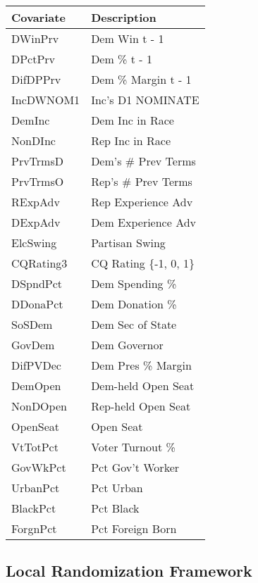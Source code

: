 \documentclass[11pt,leqno]{article}\usepackage[]{graphicx}\usepackage[]{color}
\newenvironment{knitrout}{}{} %
\theoremstyle{newstyle}
\begin{document}
\begin{knitrout}\footnotesize
{}\color{fgcolor}
\begin{tabular}{l|l}
\hline
Covariate & Description\\
\hline
DWinPrv & Dem Win t - 1\\
\hline
DPctPrv & Dem \% t - 1\\
\hline
DifDPPrv & Dem \% Margin t - 1\\
\hline
IncDWNOM1 & Inc's D1 NOMINATE\\
\hline
DemInc & Dem Inc in Race\\
\hline
NonDInc & Rep Inc in Race\\
\hline
PrvTrmsD & Dem's \# Prev Terms\\
\hline
PrvTrmsO & Rep's \# Prev Terms\\
\hline
RExpAdv & Rep Experience Adv\\
\hline
DExpAdv & Dem Experience Adv\\
\hline
ElcSwing & Partisan Swing\\
\hline
CQRating3 & CQ Rating \{-1, 0, 1\}\\
\hline
DSpndPct & Dem Spending \%\\
\hline
DDonaPct & Dem Donation \%\\
\hline
SoSDem & Dem Sec of State\\
\hline
GovDem & Dem Governor\\
\hline
DifPVDec & Dem Pres \% Margin\\
\hline
DemOpen & Dem-held Open Seat\\
\hline
NonDOpen & Rep-held Open Seat\\
\hline
OpenSeat & Open Seat\\
\hline
VtTotPct & Voter Turnout \%\\
\hline
GovWkPct & Pct Gov't Worker\\
\hline
UrbanPct & Pct Urban\\
\hline
BlackPct & Pct Black\\
\hline
ForgnPct & Pct Foreign Born\\
\hline
\end{tabular}


\end{knitrout}

\subsection{Local Randomization Framework}
\end{document}
